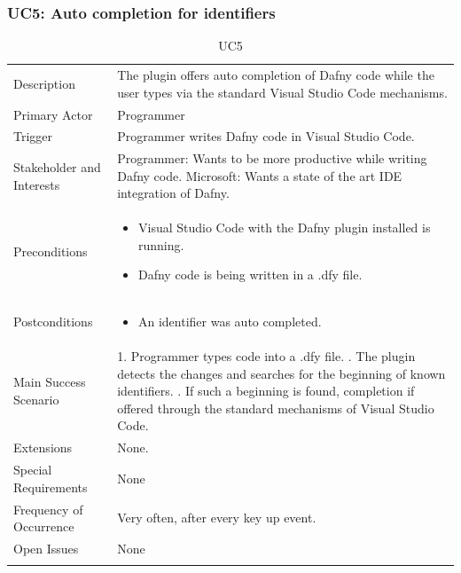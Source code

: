 \subsubsection{UC5: Auto completion for identifiers}
\begin{longtable}{l | p{} }
	Description & The plugin offers auto completion of Dafny code while the user types via the standard Visual Studio Code mechanisms.\\ 
	Primary Actor & Programmer\\ 
	Trigger & Programmer writes Dafny code in Visual Studio Code.\\ 
	Stakeholder and Interests & Programmer: Wants to be more productive while writing Dafny code. \newline Microsoft: Wants a state of the art IDE integration of Dafny.\\ 
	Preconditions &
	\begin{itemize}
		\item Visual Studio Code with the Dafny plugin installed is running.
		\item Dafny code is being written in a .dfy file.
	\end{itemize}\\ 
	Postconditions &
	\begin{itemize}
		\item An identifier was auto completed.
	\end{itemize}\\ 
	Main Success Scenario & 
	1. Programmer types code into a .dfy file. \newline
	2. The plugin detects the changes and searches for the beginning of known identifiers. \newline
	3. If such a beginning is found, completion if offered through the standard mechanisms of Visual Studio Code.\\ 
	Extensions & 
	None. \\ 
	Special Requirements & None\\ 
	Frequency of Occurrence & Very often, after every key up event.\\ 
	Open Issues & None \\ 
	\caption{UC5}
\end{longtable}